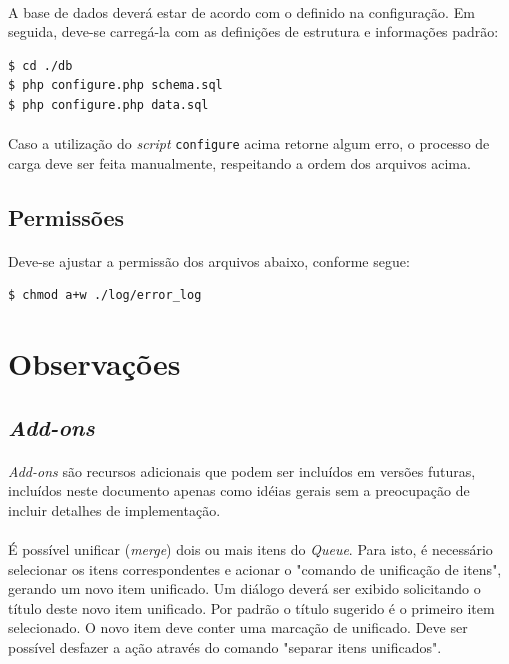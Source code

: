 \documentclass[a4paper,12pt]{article}
\def\queue{\emph{Queue}}
\begin{document}
\paragraph{}
A base de dados deverá estar de acordo com o definido na configuração. Em seguida, deve-se carregá-la com as definições de estrutura e informações padrão:

\begin{verbatim}
$ cd ./db
$ php configure.php schema.sql
$ php configure.php data.sql
\end{verbatim}

\paragraph{}
Caso a utilização do \emph{script} \texttt{configure} acima retorne algum erro, o processo de carga deve ser feita manualmente, respeitando a ordem dos arquivos acima.

\subsection{Permissões}

\paragraph{}
Deve-se ajustar a permissão dos arquivos abaixo, conforme segue:

\begin{verbatim}
$ chmod a+w ./log/error_log
\end{verbatim}

\appendix

\section{Observações}

\subsection{\emph{Add-ons}}

\paragraph{}
\emph{Add-ons} são recursos adicionais que podem ser incluídos em versões
futuras, incluídos neste documento apenas como idéias gerais sem a preocupação
de incluir detalhes de implementação.

\paragraph{}
É possível unificar (\emph{merge}) dois ou mais itens do \queue{}. Para isto, é
necessário selecionar os itens correspondentes e acionar o "comando de
unificação de itens", gerando um novo item unificado. Um diálogo deverá ser
exibido solicitando o título deste novo item unificado. Por padrão o título
sugerido é o primeiro item selecionado. O novo item deve conter uma marcação de
unificado. Deve ser possível desfazer a ação através do comando "separar itens
unificados".
\end{document}
